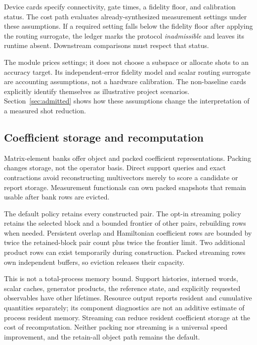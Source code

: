 \documentclass[aps,pra,reprint,superscriptaddress,nofootinbib,floatfix,
  showkeys]{revtex4-2}
\begin{document}
Device cards specify connectivity, gate times, a fidelity floor, and calibration
status. The cost path evaluates already-synthesized measurement settings under
these assumptions. If a required setting falls below the fidelity floor after
applying the routing surrogate, the ledger marks the protocol
\emph{inadmissible} and leaves its runtime absent. Downstream comparisons must
respect that status.

The module prices settings; it does not choose a subspace or allocate shots to
an accuracy target. Its independent-error fidelity model and scalar routing
surrogate are accounting assumptions, not a hardware calibration. The
non-baseline cards explicitly identify themselves as illustrative project
scenarios. Section~\ref{sec:admitted} shows how these assumptions change the
interpretation of a measured shot reduction.

\subsection{Coefficient storage and recomputation}
\label{sec:storage}

Matrix-element banks offer object and packed coefficient representations.
Packing changes storage, not the operator basis. Direct support queries and
exact contractions avoid reconstructing multivectors merely to score a
candidate or report storage. Measurement functionals can own packed snapshots
that remain usable after bank rows are evicted.

The default policy retains every constructed pair. The opt-in streaming policy
retains the selected block and a bounded frontier of other pairs, rebuilding
rows when needed. Persistent overlap and Hamiltonian coefficient rows are
bounded by twice the retained-block pair count plus twice the frontier limit.
Two additional product rows can exist temporarily during construction. Packed
streaming rows own independent buffers, so eviction releases their capacity.

This is not a total-process memory bound. Support histories, interned words,
scalar caches, generator products, the reference state, and explicitly requested
observables have other lifetimes. Resource output reports resident and cumulative
quantities separately; its component diagnostics are not an additive estimate
of process resident memory. Streaming can reduce resident coefficient storage at
the cost of recomputation. Neither packing nor streaming is a universal speed
improvement, and the retain-all object path remains the default.
\end{document}
